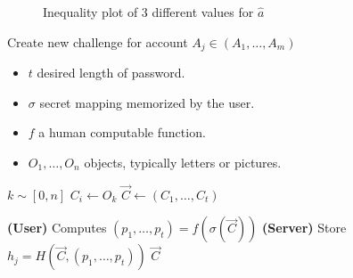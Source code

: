 \begin{figure}
\caption{Inequality plot of 3 different values for $\hat a$}
\label{a-var}
\end{figure}

\begin{algorithm}
    \caption{Create new challenge for account $A_j \in (A_1,\dots, A_m)$}\label{new-challenge}
    \begin{algorithmic}[1]
        \Require
            \Statex \begin{itemize}
                \item $t$ desired length of password.
                \item $\sigma$ secret mapping memorized by the user.
                \item $f$ a human computable function.
                \item $O_1,\dots,O_n$ objects, typically letters or pictures.
            \end{itemize}
            
        
            \State $k \sim [0, n] $
            \State $C_i \leftarrow O_k $
        \EndFor
        \Statex
        \State $\vec C \leftarrow (C_1,\dots, C_t) $

        \State \textbf{(User)} Computes $(p_1,\dots,p_t)=f(\sigma(\vec C))$
        \State \textbf{(Server)} Store $h_j = H(\vec C , (p_1,\dots,p_t))$
        \State
        \State \Return $\vec C$
    \end{algorithmic}
    \label{new-challenge-algo}
\end{algorithm}


